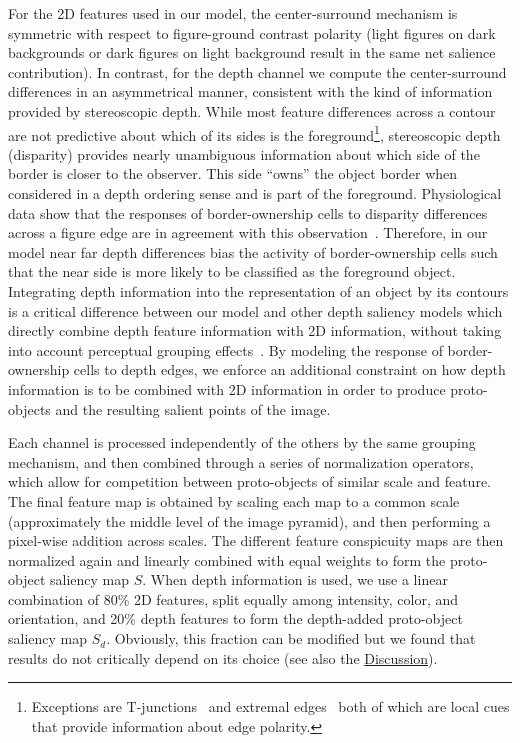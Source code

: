 For the 2D features used in our model, the center-surround mechanism is symmetric with respect to figure-ground contrast polarity (\eg light figures on dark backgrounds or dark figures on light background result in the same net salience contribution). In contrast, for the depth channel we compute the center-surround differences in an asymmetrical manner, consistent with the kind of information provided by stereoscopic depth. While most feature differences across a contour are not predictive about which of its sides is the foreground\footnote{Exceptions are T-junctions~\citep{Heitger_vonderHeydt93} and extremal edges~\citep{Palmer_Ghose08,Ramenahalli_etal11a,Ramenahalli_etal12a,Ramenahalli_etal14a} both of which are local cues that provide information about edge polarity.\label{EEfootnote}}, stereoscopic depth (disparity) provides nearly unambiguous information about which side of the border is closer to the observer. This side ``owns'' the object border when considered in a depth ordering sense and is part of the foreground. Physiological data show that the responses of border-ownership cells to disparity differences across a figure edge are in agreement with this observation~\citep{Zhou_etal00,Qiu_vonderHeydt05}. Therefore, in our model near \vs far depth differences bias the activity of border-ownership cells such that the near side is more likely to be classified as the foreground object. Integrating depth information into the representation of an object by its contours is a critical difference between our model and other depth saliency models which directly combine depth feature information with 2D information, without taking into account perceptual grouping effects~\cite[\eg][]{Ouerhani_etal00,Jost_etal04,Hugli_etal05}. By modeling the response of border-ownership cells to depth edges, we enforce an additional constraint on how depth information is to be combined with 2D information in order to produce proto-objects and the resulting salient points of the image.

Each channel is processed independently of the others by the same grouping mechanism, and then combined through a series of normalization operators, which allow for competition between proto-objects of similar scale and feature. The final feature map is obtained by scaling each map to a common scale (approximately the middle level of the image pyramid), and then performing a pixel-wise addition across scales. The different feature conspicuity maps are then normalized again and linearly combined with equal weights to form the proto-object saliency map $S$. When depth information is used, we use a linear combination of 80\% 2D features, split equally among intensity, color, and orientation, and 20\% depth features to form the depth-added proto-object saliency map $S_d$. Obviously, this fraction can be modified but we found that results do not critically depend on its choice (see also the \hyperref[sec:discussion]{Discussion}).


